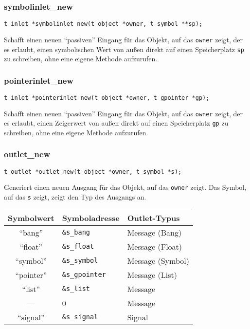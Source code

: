 \documentclass[12pt, a4paper,austrian, titlepage]{article}
\begin{document}
\begin{appendix}
\subsubsection{symbolinlet\_new}
\begin{verbatim}
t_inlet *symbolinlet_new(t_object *owner, t_symbol **sp);
\end{verbatim}
Schafft einen neuen ``passiven'' Eingang für das Objekt, auf das \verb+owner+ zeigt,
der es erlaubt, einen symbolischen Wert von außen direkt auf einen 
Speicherplatz \verb+sp+ zu schreiben, ohne eine eigene Methode aufzurufen.

\subsubsection{pointerinlet\_new}
\begin{verbatim}
t_inlet *pointerinlet_new(t_object *owner, t_gpointer *gp);
\end{verbatim}
Schafft einen neuen ``passiven'' Eingang für das Objekt, auf das \verb+owner+ zeigt,
der es erlaubt, einen Zeigerwert von außen direkt auf einen 
Speicherplatz \verb+gp+ zu schreiben, ohne eine eigene Methode aufzurufen.

\subsubsection{outlet\_new}
\begin{verbatim}
t_outlet *outlet_new(t_object *owner, t_symbol *s);
\end{verbatim}
Generiert einen neuen Ausgang für das Objekt, auf das \verb+owner+ zeigt.
Das Symbol, auf das \verb+s+ zeigt, zeigt den Typ des Ausgangs an.

\begin{tabular}{c|l||l}
Symbolwert & Symboladresse & Outlet-Typus \\
\hline\hline
``bang'' & \verb+&s_bang+ & Message (Bang)\\
``float'' & \verb+&s_float+ & Message (Float)\\
``symbol'' & \verb+&s_symbol+ & Message (Symbol) \\
``pointer'' & \verb+&s_gpointer+ & Message (List)\\
``list'' & \verb+&s_list+ & Message \\
--- & 0 & Message \\
\hline
``signal'' & \verb+&s_signal+ & Signal \\
\end{tabular}


\end{appendix}
\end{document}
